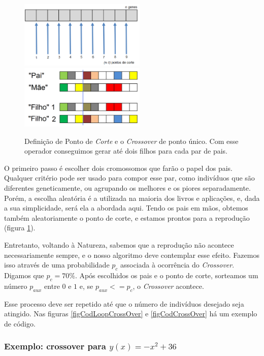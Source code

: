 	\begin{figure}[htp]
		\begin{center}
			\includegraphics[width=6cm]{figs/ga/PontosCorte.png}
			\includegraphics[width=6cm]{figs/ga/CrossOver.png}
		\end{center}
		\caption{\label{figCrossOver}Definição de Ponto de \textit{Corte} e o \textit{Crossover} de ponto único. Com esse operador conseguimos gerar até dois filhos para cada par de pais.}
	\end{figure}
	
	O primeiro passo é escolher dois cromossomos que farão o papel dos pais. Qualquer critério pode ser usado para compor esse par, como indivíduos que são diferentes geneticamente, ou agrupando os melhores e os piores separadamente. Porém, a escolha aleatória é a utilizada na maioria dos livros e aplicações, e, dada a sua simplicidade, será ela a abordada aqui. Tendo os pais em mãos, obtemos também aleatoriamente o ponto de corte, e estamos prontos para a reprodução (figura \ref{figCrossOver}). 
	
	Entretanto, voltando à Natureza, sabemos que a reprodução não acontece necessariamente sempre, e o nosso algoritmo deve contemplar esse efeito. Fazemos isso através de uma probabilidade $p_c$ associada à ocorrência do \textit{Crossover}. Digamos que $p_c = 70\%$. Após escolhidos os pais e o ponto de corte, sorteamos um número $p_{aux}$ entre $0$ e $1$ e, se $p_{aux} <= p_c$, o \textit{Crossover} acontece.
	
	Esse processo deve ser repetido até que o número de indivíduos desejado seja atingido. Nas figuras \ref{figCodLoopCrossOver} e \ref{figCodCrossOver} há um exemplo de código.
	
	\subsubsection{Exemplo: crossover para $y(x) = -x^2 + 36$}
	
